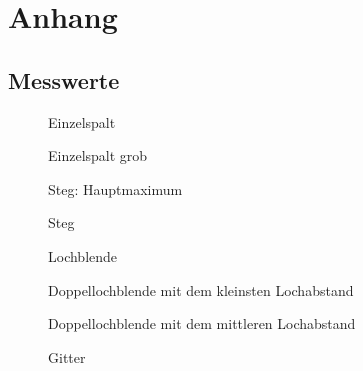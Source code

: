 \documentclass[12pt,a4paper,titlepage,headinclude,bibtotoc]{scrartcl}
\begin{document}
\section{Anhang}
\subsection{Messwerte}
\begin{figure}[!htb]
	\centering
	
	\caption{Einzelspalt}
\end{figure}

\begin{figure}[!htb]
	\centering
	
	\caption{Einzelspalt grob}
\end{figure}

\begin{figure}[!htb]
	\centering
	
	\caption{Steg: Hauptmaximum}
\end{figure}

\begin{figure}[!htb]
	\centering
	
	\caption{Steg}
\end{figure}

\begin{figure}[!htb]
	\centering
	
	\caption{Lochblende}
\end{figure}

\begin{figure}[!htb]
	\centering
	
	\caption{Doppellochblende mit dem kleinsten Lochabstand}
\end{figure}

\begin{figure}[!htb]
	\centering
	
	\caption{Doppellochblende mit dem mittleren Lochabstand}
\end{figure}

\begin{figure}[!htb]
	\centering
	
	\caption{Gitter}
\end{figure}
\end{document}
